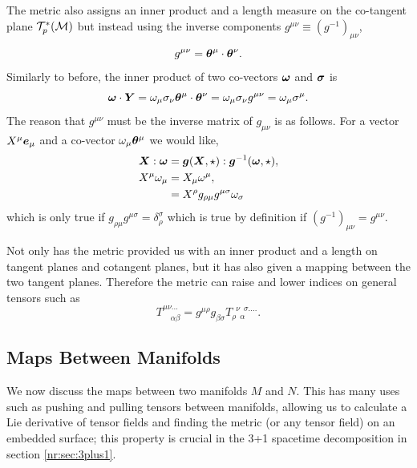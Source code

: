 The metric also assigns an inner product and a length measure on the co-tangent plane $\mathcal{T}^*_p(\mathcal{M})$ but instead using the inverse components $g^{\mu\nu} \equiv (g^{-1})_{\mu\nu}$,
\begin{equation}
g^{\mu\nu} = \boldsymbol{\theta}^\mu \cdot \boldsymbol{\theta}^\nu.
\end{equation}
Similarly to before, the inner product of two co-vectors $\boldsymbol{\omega}$ and $\boldsymbol{\sigma}$ is
\begin{equation}
\boldsymbol{\omega} \cdot \boldsymbol{Y} = \omega_\mu \sigma_\nu \boldsymbol{\theta}^\mu \cdot \boldsymbol{\theta}^\nu = \omega_\mu \sigma_\nu g^{\mu\nu} = \omega_\mu \sigma^\mu.
\end{equation}
The reason that $g^{\mu\nu}$ must be the inverse matrix of $g_{\mu\nu}$ is as follows. For a vector $X^\mu \boldsymbol{e}_\mu$ and a co-vector $\omega_\mu \boldsymbol{\theta}^\mu$ we would like, 
\begin{align}
\boldsymbol{X} : \boldsymbol{\omega} &= \boldsymbol{g}(\boldsymbol{X},\star) : \boldsymbol{g}^{-1}(\boldsymbol{\omega},\star) ,\\
X^\mu \omega_\mu  &= X_\mu \omega^\mu ,\\
&= X^\rho g_{\rho\mu}g^{\mu\sigma} \omega_\sigma
\end{align}
which is only true if $g_{\rho\mu}g^{\mu\sigma} = \delta^\sigma_\rho$ which is true by definition if $(g^{-1})_{\mu\nu} = g^{\mu\nu}$.

Not only has the metric provided us with an inner product and a length on tangent planes and cotangent planes, but it has also given a mapping between the two tangent planes. Therefore the metric can raise and lower indices on general tensors such as
\begin{equation}
T^{\mu\nu ...}_{\,\,\,\,\,\, \alpha \beta} = g^{\mu\rho}g_{\beta\sigma}T^{\,\,\, \nu \,\,\, \sigma ....}_{\rho \,\,\, \alpha}.
\end{equation}



\subsection{Maps Between Manifolds}\label{intro:sect:map}
We now discuss the maps between two manifolds $M$ and $N$. This has many uses such as pushing and pulling tensors between manifolds, allowing us to calculate a Lie derivative of tensor fields and finding the metric (or any tensor field) on an embedded surface; this property is crucial in the 3+1 spacetime decomposition in section \ref{nr:sec:3plus1}.

